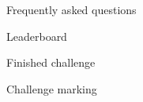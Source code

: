 \documentclass{report}
\begin{document}
\begin{figure}
\caption{Frequently asked questions}
\end{figure}

\begin{figure}
\caption{Leaderboard}
\end{figure}

\begin{figure}
\caption{Finished challenge}
\end{figure}

\begin{figure}
\caption{Challenge marking}
\end{figure}
\end{document}
